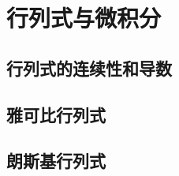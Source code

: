 \begingroup
{}
\def\theHchapter{\arabic{chapter}ε}

\chapter{行列式与微积分}

\section{行列式的连续性和导数}

\section{雅可比行列式}

\section{朗斯基行列式}

\endgroup
